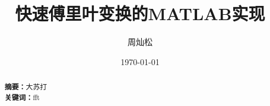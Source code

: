 \documentclass{../source/zju}
\title{\zihao{4} \bf{快速傅里叶变换的MATLAB实现}}
\author{\zihao{5}周灿松}
\date{}
\date{\today}
\begin{document}
\makecover
\maketitle
\begin{abstract}
    \noindent
    {\bf 摘要：}大苏打\\
    {\bf 关键词：}fft
\end{abstract}

\section{}
\subsection{}
\subsubsection{}
\end{document}
